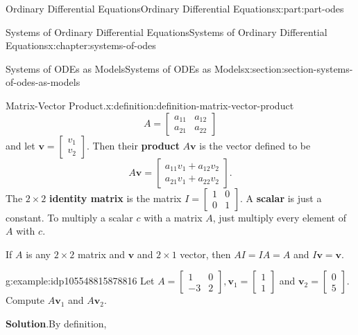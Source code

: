 \documentclass[twoside,10pt,]{book}
\newcommand{\blocktitlefont}{\relax}
\newcommand{\terminology}[1]{\textbf{#1}}
\numberwithin{equation}{part}
\renewcommand{\vec}[1]{\mathbf{#1}}
\newcommand{\amp}{&}
\begin{document}
\begin{partptx}{Ordinary Differential Equations}{}{Ordinary Differential Equations}{}{}{x:part:part-odes}
\begin{chapterptx}{Systems of Ordinary Differential Equations}{}{Systems of Ordinary Differential Equations}{}{}{x:chapter:systems-of-odes}
\begin{sectionptx}{Systems of ODEs as Models}{}{Systems of ODEs as Models}{}{}{x:section:section-systems-of-odes-as-models}
\begin{definition}{Matrix-Vector Product.}{x:definition:definition-matrix-vector-product}
\begin{equation*}
A = \begin{bmatrix} a_{11}\amp a_{12}\\a_{21}\amp a_{22} \end{bmatrix}
\end{equation*}
and let \(\vec{v} = \begin{bmatrix} v_{1}\\v_{2} \end{bmatrix}\). Then their \terminology{product} \(A\vec{v}\) is the vector defined to be%
\begin{equation*}
A\vec{v} = \begin{bmatrix} a_{11}v_{1}+a_{12}v_{2}\\a_{21}v_{1}+a_{22}v_{2} \end{bmatrix}.
\end{equation*}
The \(2\times 2\) \terminology{identity matrix} is the matrix \(I = \begin{bmatrix}1\amp0\\0\amp1\end{bmatrix}\). A \terminology{scalar} is just a constant. To multiply a scalar \(c\) with a matrix \(A\), just multiply every element of \(A\) with \(c\).%
\end{definition}
If \(A\) is any \(2\times2\) matrix and \(\vec{v}\) and \(2\times1\) vector, then \(AI=IA=A\) and \(I\vec{v} = \vec{v}\).%
\begin{example}{}{g:example:idp105548815878816}%
Let \(A = \begin{bmatrix} 1\amp0\\-3\amp2 \end{bmatrix},\vec{v}_{1} = \begin{bmatrix}1\\1\end{bmatrix}\) and \(\vec{v}_{2} = \begin{bmatrix}0\\5\end{bmatrix}\). Compute \(A\vec{v}_{1}\) and \(A\vec{v}_{2}\).%
\par\smallskip%
\noindent\textbf{\blocktitlefont Solution}.\hypertarget{g:solution:idp105548815848096}{}\quad{}By definition,%
\begin{equation*}

\end{equation*}
\end{example}
\end{sectionptx}
\end{chapterptx}
\end{partptx}
\end{document}
